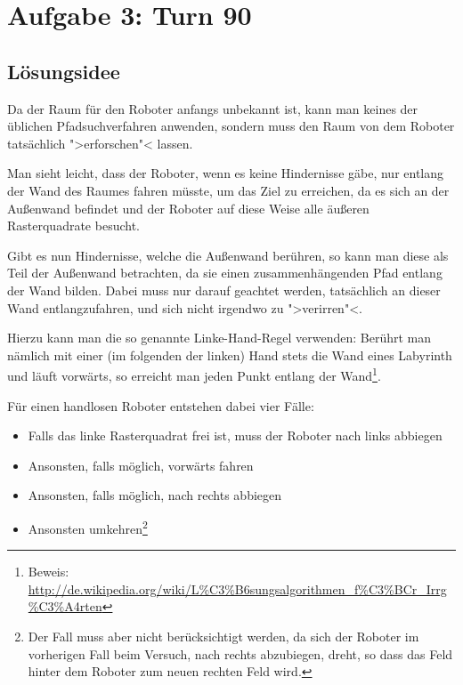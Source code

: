 \documentclass[10pt,a4paper]{article}
\begin{document}
\setcounter{section}{2}
\section{Aufgabe 3: Turn 90}

\subsection{Lösungsidee}

Da der Raum für den Roboter anfangs unbekannt ist, kann man keines der üblichen Pfadsuchverfahren anwenden, sondern muss den Raum von dem Roboter tatsächlich ">erforschen"< lassen.


Man sieht leicht, dass der Roboter, wenn es keine Hindernisse gäbe,  nur entlang der Wand des Raumes fahren müsste, um das Ziel zu erreichen, da es sich an der Außenwand befindet und der Roboter auf diese Weise alle äußeren Rasterquadrate besucht.

Gibt es nun Hindernisse, welche die Außenwand berühren, so kann man diese als Teil der Außenwand betrachten, da sie einen zusammenhängenden Pfad entlang der Wand bilden. %
Dabei muss nur darauf geachtet werden, tatsächlich an dieser Wand entlangzufahren, und sich nicht irgendwo zu ">verirren"<.


Hierzu kann man die so genannte Linke-Hand-Regel verwenden: Berührt man nämlich mit einer (im folgenden der linken) Hand stets die Wand eines Labyrinth und läuft vorwärts, so erreicht man jeden Punkt entlang der Wand\footnote{Beweis: \url{http://de.wikipedia.org/wiki/L\%C3\%B6sungsalgorithmen_f\%C3\%BCr_Irrg\%C3\%A4rten}}.

Für einen handlosen Roboter entstehen dabei vier Fälle: 

\begin{itemize}
\item Falls das linke Rasterquadrat frei ist, muss der Roboter nach links abbiegen
\item Ansonsten, falls möglich, vorwärts fahren
\item Ansonsten, falls möglich, nach rechts abbiegen
\item Ansonsten umkehren\footnote{Der Fall muss aber nicht berücksichtigt werden, da sich der Roboter im vorherigen Fall beim Versuch, nach rechts abzubiegen, dreht, so dass das Feld hinter dem Roboter zum neuen rechten Feld wird.}
\end{itemize}
\end{document}

